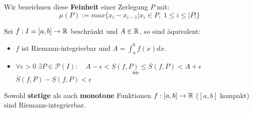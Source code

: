 \begin{definition}[Feinheit]
Wir bezeichnen diese \textbf{Feinheit} einer Zerlegung $P$ mit:
$$\mu(P) := max\{x_i -x_{i-1} |x_i \in P,\; 1 \leq i \leq |P|\}$$
\end{definition}

\begin{theorem}
Sei $f:I=[a,b]\to\mathbb{R}$ beschränkt und $A\in\mathbb{R}$, so sind äquivalent:
\begin{itemize}
\item $f$ ist Riemann-integrierbar und $A = \int_a^bf(x)dx$.
\item $\forall \epsilon > 0 \; \exists P \in \mathcal{P}(I):\quad A-\epsilon < \underline{S}(f,P)\leq \overline{S}(f,P) < A+\epsilon$ $$\Leftrightarrow$$ $\overline{S}(f,P) - \underline{S}(f,P) < \epsilon$
\end{itemize}
\end{theorem}

\begin{theorem}
Sowohl \textbf{stetige} als auch \textbf{monotone} Funktionen $f:[a,b]\rightarrow\mathbb{R}$ ($[a,b]$ kompakt) sind Riemann-integrierbar.
\end{theorem}


